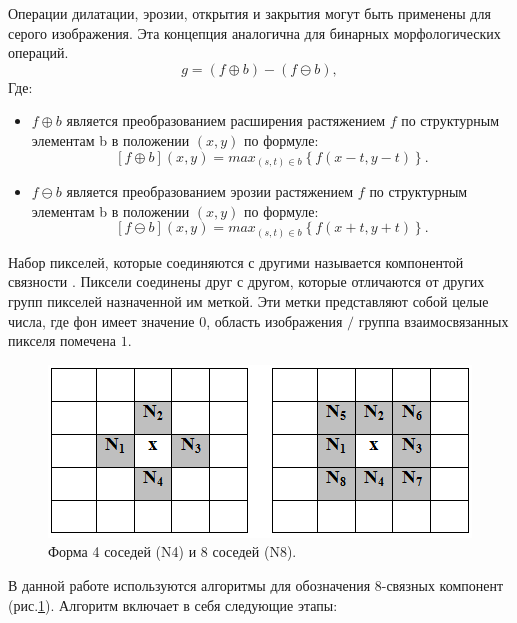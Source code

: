 Операции дилатации, эрозии, открытия и закрытия могут быть применены для серого изображения. Эта концепция аналогична для бинарных морфологических операций.
\begin{equation}\label{eq3}
 g=\left(f\oplus b \right)-\left(f\ominus b\right),
\end{equation}
Где:

\begin{itemize}
	\item $f\oplus b$ является преобразованием расширения растяжением $f$ по структурным элементам b в положении $\left(x,y\right)$ по формуле:
	\begin{equation}\label{eq4}
\left[f\oplus b\right]\left(x,y\right)=max_{\left(s,t\right)\in b}\left\{f\left(x-t,y-t\right)\right\}.
\end{equation}
\item $f \ominus b$ является преобразованием эрозии растяжением $f$ по структурным элементам b в положении $\left(x,y\right)$ по формуле:
	\begin{equation}\label{eq5}
\left[f \ominus b\right]\left(x,y\right)=max_{\left(s,t\right)\in b}\left\{f\left(x+t,y+t\right)\right\}.
\end{equation}
\end{itemize}
Набор пикселей, которые соединяются с другими называется компонентой связности \cite{Solomon2011}. Пиксели соединены друг с другом, которые отличаются от других групп пикселей назначенной им меткой. Эти метки представляют собой целые числа, где фон имеет значение $0$, область изображения $/$ группа взаимосвязанных пикселя помечена $1$.
\begin{figure}[ht!]
\centering
\includegraphics [scale=0.8] {images/h9.png}
\begin{center}
\caption{Форма 4 соседей (N4) и 8 соседей (N8).} \label{img9}
\end{center}
\end{figure}
В данной работе используются алгоритмы для обозначения 8-связных компонент (рис.\ref{img9}). Алгоритм включает в себя следующие этапы:

